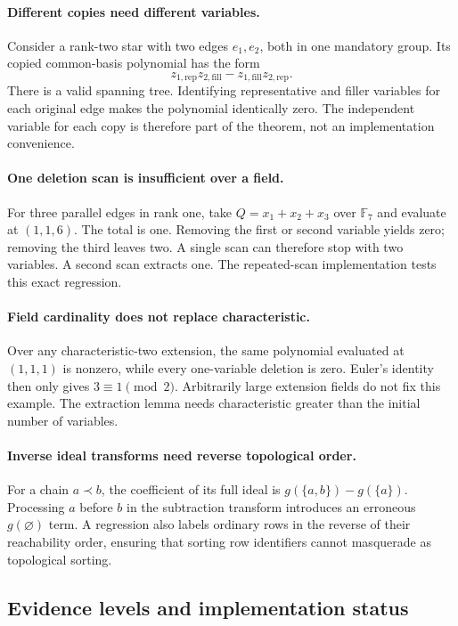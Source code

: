 \paragraph{Different copies need different variables.}
Consider a rank-two star with two edges $e_1,e_2$, both in one mandatory
group.  Its copied common-basis polynomial has the form
\[
     z_{1,\mathrm{rep}}z_{2,\mathrm{fill}}
       -z_{1,\mathrm{fill}}z_{2,\mathrm{rep}}.
\]
There is a valid spanning tree.  Identifying representative and filler
variables for each original edge makes the polynomial identically zero.
The independent variable for each copy is therefore part of the theorem,
not an implementation convenience.

\paragraph{One deletion scan is insufficient over a field.}
For three parallel edges in rank one, take
$Q=x_1+x_2+x_3$ over $\mathbb F_7$ and evaluate at $(1,1,6)$.
The total is one.  Removing the first or second variable yields zero;
removing the third leaves two.  A single scan can therefore stop with two
variables.  A second scan extracts one.  The repeated-scan implementation
tests this exact regression.

\paragraph{Field cardinality does not replace characteristic.}
Over any characteristic-two extension, the same polynomial evaluated at
$(1,1,1)$ is nonzero, while every one-variable deletion is zero.  Euler's
identity then only gives $3\equiv1\pmod2$.  Arbitrarily large extension
fields do not fix this example.  The extraction lemma needs characteristic
greater than the initial number of variables.

\paragraph{Inverse ideal transforms need reverse topological order.}
For a chain $a\prec b$, the coefficient of its full ideal is
$g(\{a,b\})-g(\{a\})$.  Processing $a$ before $b$ in the subtraction
transform introduces an erroneous $g(\varnothing)$ term.  A regression
also labels ordinary rows in the reverse of their reachability order,
ensuring that sorting row identifiers cannot masquerade as topological
sorting.

\subsection{Evidence levels and implementation status}

